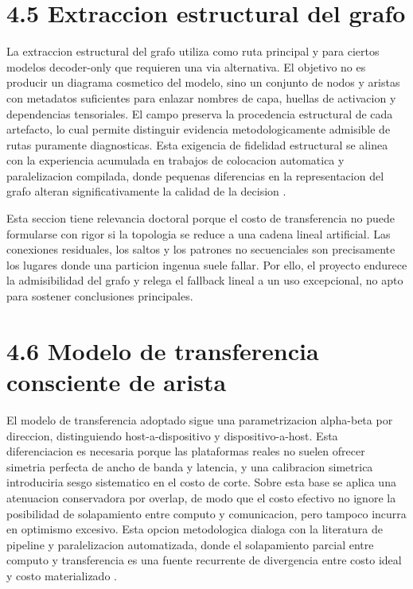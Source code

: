 \section{4.5 Extraccion estructural del grafo}
La extraccion estructural del grafo utiliza  como ruta principal y  para ciertos modelos decoder-only que requieren una via alternativa. El objetivo no es producir un diagrama cosmetico del modelo, sino un conjunto de nodos y aristas con metadatos suficientes para enlazar nombres de capa, huellas de activacion y dependencias tensoriales. El campo  preserva la procedencia estructural de cada artefacto, lo cual permite distinguir evidencia metodologicamente admisible de rutas puramente diagnosticas. Esta exigencia de fidelidad estructural se alinea con la experiencia acumulada en trabajos de colocacion automatica y paralelizacion compilada, donde pequenas diferencias en la representacion del grafo alteran significativamente la calidad de la decision \cite{mirhoseini2017device,jia2019beyond,zheng2022alpa}.

Esta seccion tiene relevancia doctoral porque el costo de transferencia no puede formularse con rigor si la topologia se reduce a una cadena lineal artificial. Las conexiones residuales, los saltos y los patrones no secuenciales son precisamente los lugares donde una particion ingenua suele fallar. Por ello, el proyecto endurece la admisibilidad del grafo y relega el fallback lineal a un uso excepcional, no apto para sostener conclusiones principales.

\section{4.6 Modelo de transferencia consciente de arista}
El modelo de transferencia adoptado sigue una parametrizacion alpha-beta por direccion, distinguiendo host-a-dispositivo y dispositivo-a-host. Esta diferenciacion es necesaria porque las plataformas reales no suelen ofrecer simetria perfecta de ancho de banda y latencia, y una calibracion simetrica introduciria sesgo sistematico en el costo de corte. Sobre esta base se aplica una atenuacion conservadora por overlap, de modo que el costo efectivo no ignore la posibilidad de solapamiento entre computo y comunicacion, pero tampoco incurra en optimismo excesivo. Esta opcion metodologica dialoga con la literatura de pipeline y paralelizacion automatizada, donde el solapamiento parcial entre computo y transferencia es una fuente recurrente de divergencia entre costo ideal y costo materializado \cite{huang2019gpipe,narayanan2019pipedream,zheng2022alpa}.

